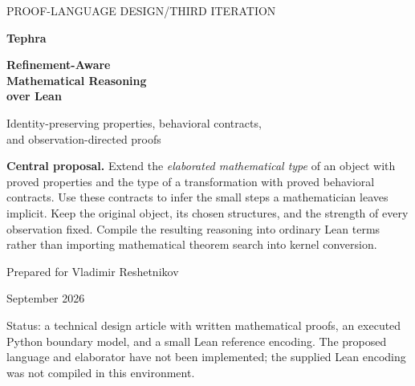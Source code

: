 \documentclass[11pt,a4paper]{article}
\theoremstyle{plain}
\theoremstyle{definition}
\begin{document}
\begin{titlepage}
\vspace*{6mm}
{\sffamily\small\color{muted}PROOF-LANGUAGE DESIGN\quad /\quad THIRD ITERATION\par}
\vspace{12mm}
{\sffamily\bfseries\color{ink}\fontsize{34}{40}\selectfont Tephra\par}
\vspace{4mm}
{\sffamily\bfseries\color{ink}\fontsize{24}{29}\selectfont Refinement-Aware\\Mathematical Reasoning\\over Lean\par}
\vspace{8mm}
{\sffamily\Large Identity-preserving properties, behavioral contracts,\\and observation-directed proofs\par}
\vspace{12mm}
\begin{principle}
\textbf{Central proposal.} Extend the \emph{elaborated mathematical type} of an object with proved properties and the type of a transformation with proved behavioral contracts. Use these contracts to infer the small steps a mathematician leaves implicit. Keep the original object, its chosen structures, and the strength of every observation fixed. Compile the resulting reasoning into ordinary Lean terms rather than importing mathematical theorem search into kernel conversion.
\end{principle}
\vfill
{\sffamily Prepared for Vladimir Reshetnikov\par}
{ September 2026\par}
\vspace{4mm}
{\small\color{muted}Status: a technical design article with written mathematical proofs, an executed Python boundary model, and a small Lean reference encoding. The proposed language and elaborator have not been implemented; the supplied Lean encoding was not compiled in this environment.\par}
\end{titlepage}
\end{document}
